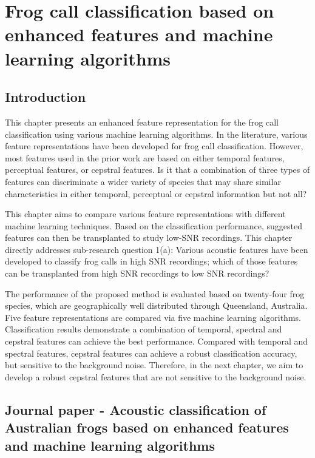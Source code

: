 
\chapter[Frog call classification based on enhanced features]{Frog call classification based on enhanced features and machine learning algorithms}
\label{cha:cha4EnhancedFeature}



\section{Introduction}
\label{S:1}

This chapter presents an enhanced feature representation for the frog call classification using various machine learning algorithms. In the literature, various feature representations have been developed for frog call classification. However, most features used in the prior work are based on either temporal features, perceptual features, or cepstral features. Is it that a combination of three types of features can discriminate a wider variety of species that may share similar characteristics in either temporal, perceptual or cepstral information but not all?

This chapter aims to compare various feature representations with different machine learning techniques. Based on the classification performance, suggested features can then be transplanted to study low-SNR recordings. This chapter directly addresses sub-research question 1(a): Various acoustic features have been developed to classify frog calls in high SNR recordings; which of those features can be transplanted from high SNR recordings to low SNR recordings?

The performance of the proposed method is evaluated based on twenty-four frog species, which are geographically well distributed through Queensland, Australia. Five feature representations are compared via five machine learning algorithms. Classification results demonstrate a combination of temporal, spectral and cepstral features can achieve the best performance. Compared with temporal and spectral features, cepstral features can achieve a robust classification accuracy, but sensitive to the background noise. Therefore, in the next chapter, we aim to develop a robust cepstral features that are not sensitive to the background noise.




\section{Journal paper - Acoustic classification of Australian frogs based on enhanced features and machine learning algorithms}




